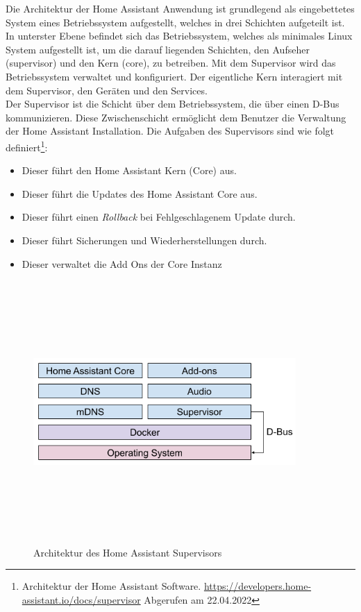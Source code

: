     Die Architektur der Home Assistant Anwendung ist grundlegend als eingebettetes System eines Betriebssystem aufgestellt, welches in 
    drei Schichten aufgeteilt ist. In unterster Ebene befindet sich das Betriebssystem, welches als minimales Linux System aufgestellt 
    ist, um die darauf liegenden Schichten, den Aufseher (supervisor) und den Kern (core), zu betreiben. Mit dem Supervisor wird das 
    Betriebssystem verwaltet und konfiguriert. Der eigentliche Kern interagiert mit dem Supervisor, den Geräten und den Services. 
    \\
    \linebreak
    Der Supervisor ist die Schicht über dem Betriebssystem, die über einen D-Bus kommunizieren. Diese Zwischenschicht ermöglicht dem 
    Benutzer die Verwaltung der Home Assistant Installation. Die Aufgaben des Supervisors sind wie folgt 
    definiert\footnote{Architektur der Home Assistant Software. \url{https://developers.home-assistant.io/docs/supervisor} Abgerufen am 22.04.2022}: 
    \begin{itemize}
        \item Dieser führt den Home Assistant Kern (Core) aus.
        \item Dieser führt die Updates des Home Assistant Core aus.
        \item Dieser führt einen \textit{Rollback} bei Fehlgeschlagenem Update durch.
        \item Dieser führt Sicherungen und Wiederherstellungen durch.
        \item Dieser verwaltet die Add Ons der Core Instanz
    \end{itemize}
    \begin{figure}
        \centering
        \includegraphics[width=10cm,height=10cm,keepaspectratio]{images/ha_architecture_2020.png}
        \caption{Architektur des Home Assistant Supervisors}
        \label{fig:architectureHAOS}
    \end{figure}

